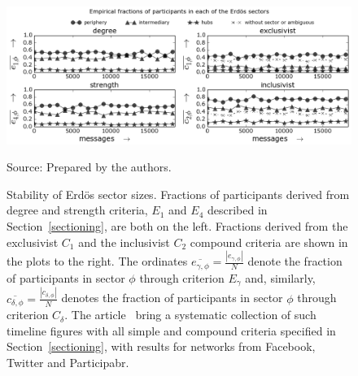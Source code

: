 														\begin{figure} 
														\centering
														\caption{Stability of Erd\"os sector sizes.
														Fractions of participants derived from degree and strength criteria, $E_1$ and $E_4$ described in Section~\ref{sectioning}, are both on the left.
														Fractions derived from the exclusivist $C_1$ and the inclusivist $C_2$ compound criteria are shown in the plots to the right.
														The ordinates $\overline{e_{\gamma,\phi}}=\frac{|e_{\gamma,\phi}|}{N}$ denote the fraction of participants in sector $\phi$ through criterion $E_\gamma$
														and, similarly, $\overline{c_{\delta,\phi}}=\frac{|c_{\delta,\phi}|}{N}$ denotes the fraction of participants in sector $\phi$ through criterion $C_\delta$.
															The article~\cite{stab} bring a systematic collection of such timeline figures with all simple and compound criteria specified in Section~\ref{sectioning}, with results for networks from Facebook, Twitter and Participabr.}
															\includegraphics[width=\textwidth]{figs/InText-WLAU-S1000__}
															\begin{flushleft}
																	Source: Prepared by the authors.\
																	\end{flushleft}
																	\label{fig:sectIL}
																	\end{figure}



